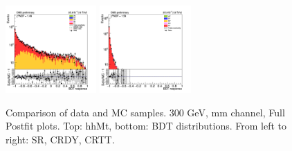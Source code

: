 \begin{figure}[tbp]
\begin{center}
    \includegraphics[width=0.31\textwidth]{figures/mm_300_july20/bdt_response_mm_CRDY_FullPostfit_plot_july20.png}
    \includegraphics[width=0.31\textwidth]{figures/mm_300_july20/bdt_response_mm_CRTT_FullPostfit_plot_july20.png}\\
    \caption{Comparison of data and MC samples. 300 GeV, mm channel, Full Postfit plots. Top: hhMt, bottom: BDT distributions. From left to right: SR, CRDY, CRTT.}
    \label{fig:MCcomparison_mm_300}



\end{center}
\end{figure}
